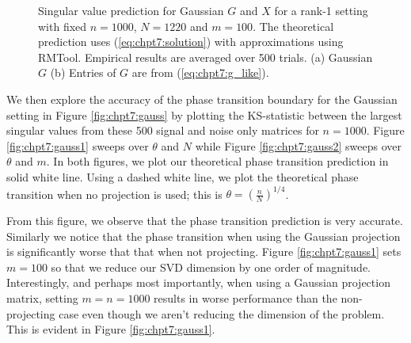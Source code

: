 \begin{figure}
  \begin{center}
    \caption{Singular value prediction for Gaussian $G$ and $X$ for a rank-1 setting
      with fixed $n=1000$, $N=1220$ and $m=100$. The theoretical prediction uses
      (\ref{eq:chpt7:solution}) with approximations using RMTool. Empirical results are
      averaged over 500 trials. (a) Gaussian $G$ (b) Entries of $G$ are from
      (\ref{eq:chpt7:g_like}).}
    \label{fig:chpt7:gauss_sv}
  \end{center}
\end{figure}

We then explore the accuracy of the phase transition boundary for the Gaussian setting in
Figure \ref{fig:chpt7:gauss} by plotting the KS-statistic between the largest singular
values from these 500 signal and noise only matrices for $n=1000$. Figure
\ref{fig:chpt7:gauss1} sweeps over $\theta$ and $N$ while Figure \ref{fig:chpt7:gauss2} sweeps
over $\theta$ and $m$. In both figures, we plot our theoretical phase transition prediction
in solid white line. Using a dashed white line, we plot the theoretical phase transition
when no projection is used; this is $\theta=\left(\frac{n}{N}\right)^{1/4}$.

From this figure, we observe that the phase transition prediction is very
accurate. Similarly we notice that the phase transition when using the Gaussian projection
is significantly worse that that when not projecting. Figure \ref{fig:chpt7:gauss1} sets
$m=100$ so that we reduce our SVD dimension by one order of magnitude. Interestingly, and
perhaps most importantly, when using a Gaussian projection matrix, setting $m=n=1000$
results in worse performance than the non-projecting case even though we aren't reducing
the dimension of the problem. This is evident in Figure \ref{fig:chpt7:gauss1}.


